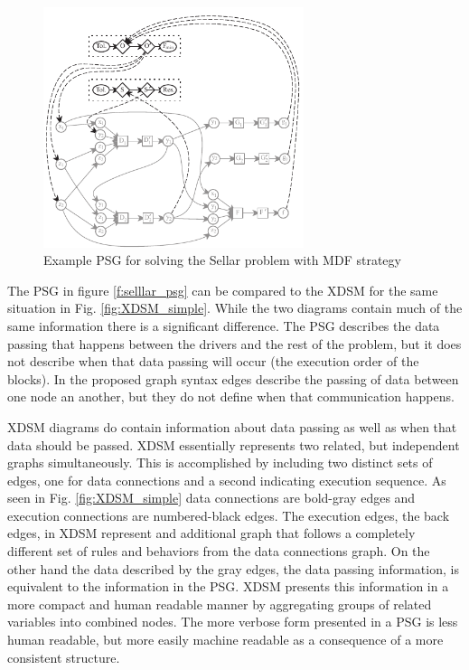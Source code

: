 \begin{figure}[htb]
    \begin{center}
    \includegraphics[width=3.0in]{images/sellar_psg}
    \end{center}
    \vspace{-10pt}
    \caption{Example PSG for solving the Sellar problem with MDF strategy}
    \label{f:sellar_psg}
\end{figure}

The PSG in figure \ref{f:selllar_psg} can be compared to the XDSM for the same situation 
in Fig. \ref{fig:XDSM_simple}. While the two diagrams contain much of the same information 
there is a significant difference. The PSG describes the data passing that happens between 
the drivers and the rest of the problem, but it does not describe when that data passing 
will occur (the execution order of the blocks). In the proposed graph syntax edges describe 
the passing of data between one node an another, but they do not define when that 
communication happens. 

XDSM diagrams do contain information about data passing as well as when that data should be passed. 
XDSM essentially represents two related, but independent graphs simultaneously. 
This is accomplished by including two distinct sets of edges, one for data 
connections and a second indicating execution sequence. As seen in Fig. \ref{fig:XDSM_simple}
data connections are bold-gray edges and execution connections are numbered-black edges. The
execution edges, the back edges, in XDSM represent and additional graph that
follows a completely different set of rules and behaviors from the data connections graph. 
On the other hand the data described by the gray edges, 
the data passing information, is equivalent to the information in the PSG. XDSM presents this 
information in a more compact and human readable manner by aggregating groups of related variables
into combined nodes. The more verbose form presented in a PSG is less human readable, but more easily 
machine readable as a consequence of a more consistent structure. 



